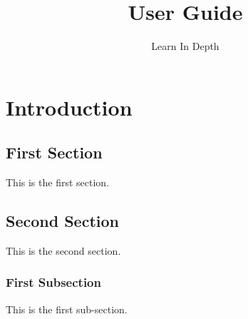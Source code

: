 \documentclass[12pt, letterpaper]{article}
\title{User Guide}
\author{Learn In Depth}
\date{\date}
\begin{document}
\chapter{Introduction}

\section{First Section}

This is the first section.

\section{Second Section}

This is the second section.

\subsection{First Subsection}

This is the first sub-section.
\end{document}
